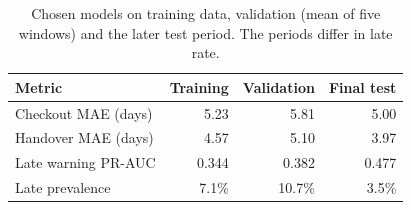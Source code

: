 \begin{table}[H]
\centering\small
\caption{Chosen models on training data, validation (mean of five windows) and the later test period. The periods differ in late rate.}
\label{tab:split-summary}
\begin{tabular}{@{}lrrr@{}}
\toprule
Metric & Training & Validation & Final test \\
\midrule
Checkout MAE (days) & 5.23 & 5.81 & 5.00 \\
Handover MAE (days) & 4.57 & 5.10 & 3.97 \\
Late warning PR-AUC & 0.344 & 0.382 & 0.477 \\
Late prevalence & 7.1\% & 10.7\% & 3.5\% \\
\bottomrule
\end{tabular}
\end{table}
